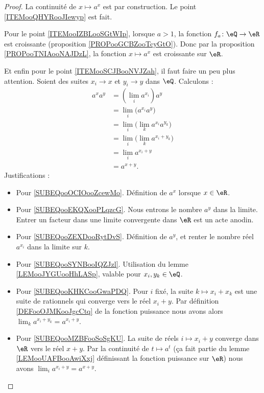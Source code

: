 \begin{proof}
	La continuité de \( x\mapsto a^x\) est par construction. Le point \ref{ITEMooQHYRooJIewyp} est fait.

	Pour le point \ref{ITEMooIZBLooSGtWIp}, lorsque \( a>1\), la fonction \( f_a\colon \eQ\to \eR\) est croissante (proposition \ref{PROPooGCBZooTcyGtO}). Donc par la proposition \ref{PROPooTNIAooNAJDzL}, la fonction \( x\mapsto a^x\) est croissante sur \( \eR\).

	Et enfin pour le point \ref{ITEMooSCJBooNVJZah}, il faut faire un peu plus attention. Soient des suites \( x_i\to x\) et \( y_i\to y\) dans \( \eQ\). Calculons :
	\begin{subequations}        \label{SUBEQSooMPNLooPoyjwJ}
		\begin{align}
			a^xa^y & =(\lim_ia^{x_i})a^y      \label{SUBEQooOCIOooZcewMo}                   \\
			       & =\lim_i\big( a^{x_i}a^y \big)   \label{SUBEQooEKQXooPLqzcG}            \\
			       & =\lim_i\big( \lim_ka^{x_i}a^{y_k} \big)    \label{SUBEQooZEXDooRytDvS} \\
			       & =\lim_i\big( \lim_k a^{x_i+y_k} \big)     \label{SUBEQooSYNBooIQZJzl}  \\
			       & =\lim_ia^{x_i+y}                           \label{SUBEQooKHKCooGwaPDQ} \\
			       & =a^{x+y}.                                  \label{SUBEQooMZBFooSoSgKU}
		\end{align}
	\end{subequations}
	Justifications :
	\begin{itemize}
		\item Pour \ref{SUBEQooOCIOooZcewMo}. Définition de \( a^x\) lorsque \( x\in \eR\).
		\item Pour \ref{SUBEQooEKQXooPLqzcG}. Nous entrons le nombre \( a^y\) dans la limite. Entrer un facteur dans une limite convergente dans \( \eR\) est un acte anodin.
		\item Pour \ref{SUBEQooZEXDooRytDvS}. Définition de \( a^y\), et renter le nombre réel \( a^{x_i}\) dans la limite sur \( k\).
		\item Pour \ref{SUBEQooSYNBooIQZJzl}. Utilisation du lemme \ref{LEMooJYGUooHhLASp}, valable pour \( x_i,y_k\in \eQ\).
		\item Pour \ref{SUBEQooKHKCooGwaPDQ}. Pour \( i\) fixé, la suite \( k\mapsto x_i+x_k\) est une suite de rationnels qui converge vers le réel \( x_i+y\). Par définition \ref{DEFooOJMKooJgcCtq} de la fonction puissance nous avons alors \( \lim_ka^{x_i+y_k}=a^{x_i+y}\).
		\item Pour \ref{SUBEQooMZBFooSoSgKU}. La suite de réels \( i\mapsto x_i+y\) converge dans \( \eR\) vers le réel \( x+y\). Par la continuité de \( t\mapsto a^t\) (ça fait partie du lemme \ref{LEMooUAFBooAwiXxj} définissant la fonction puissance sur \( \eR\)) nous avons \( \lim_ia^{x_i+y}=a^{x+y}\).
	\end{itemize}


\end{proof}

